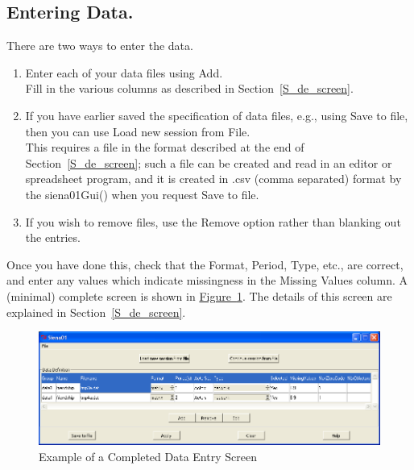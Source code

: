\documentclass[a4paper,fleqn]{article}
\newcommand{\+}{\, + \,}
\newcommand{\sfn}[1]{\textsf{#1}}
\begin{document}
{\subsection{Entering Data.}
\label{thegui}
There are two ways to enter the data.
\begin{enumerate}
\item Enter each of your data files using \sfn{Add}.\\
      Fill in the various columns as described in Section~\ref{S_de_screen}.
\item If you have earlier saved the specification
      of data files, e.g., using \sfn{Save to file}, then you can
      use \sfn{Load new session from File}.\\
      This requires a file in the format described
      at the end of  Section~\ref{S_de_screen};
      such a file can be created and read in an editor or spreadsheet program,
      and it is created in .csv (comma separated) format
      by the \sfn{ siena01Gui()} when you request
      \sfn{Save to file}.
\item If you wish to remove files, use the \sfn{Remove} option rather than
  blanking out the entries.
\end{enumerate}
Once you have done this, check that the \sfn{Format},
\sfn{Period}, \sfn{Type}, etc., are correct, and enter any
values which indicate missingness in the \sfn{Missing Values} column.
A (minimal) complete screen is shown in \hyperlink{siena2}
{Figure~\ref{fig:siena2}}.
The details of this screen are explained in Section~\ref{S_de_screen}.
  \begin{figure}[ht]
\hypertarget{siena2}{}
    \begin{center}
      \includegraphics[width=\textwidth]{siena2.png}
    \end{center}
 \caption{Example of a Completed Data Entry Screen}
 \label{fig:siena2}
\end{figure}


}
\end{document}

